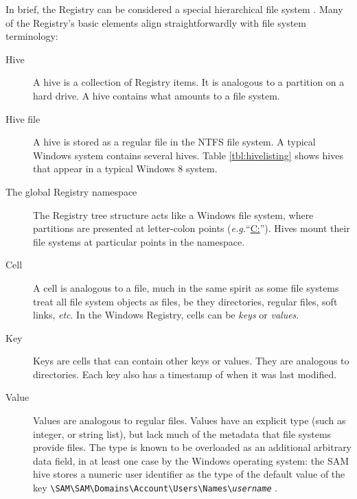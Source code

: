 \documentclass[11pt]{ucthesis}
\theoremstyle{plain}
\theoremstyle{definition}
\newcommand{\eg}{\emph{e.g.}\xspace}
\newcommand{\etc}{\emph{etc}\xspace}
\newcommand{\breakingbackslash}{\textbackslash\allowbreak{}}
\begin{document}
In brief, the Registry can be considered a special hierarchical file system \cite{nelson:ifip12}.  Many of the Registry's basic elements align straightforwardly with file system terminology:

\begin{description}
\item[Hive] A hive is a collection of Registry items.  It is analogous to a partition on a hard drive.  A hive contains what amounts to a file system.
\item[Hive file] A hive is stored as a regular file in the NTFS file system.  A typical Windows system contains several hives.  Table \ref{tbl:hivelisting} shows hives that appear in a typical Windows 8 system.
\item[The global Registry namespace] The Registry tree structure acts like a Windows file system, where partitions are presented at letter-colon points (\eg ``\url{C:}'').  Hives mount their file systems at particular points in the namespace.
\item[Cell] A cell is analogous to a file, much in the same spirit as some file systems treat all file system objects as files, be they directories, regular files, soft links, \etc.  In the Windows Registry, cells can be \emph{keys} or \emph{values}.
\item[Key] Keys are cells that can contain other keys or values.  They are analogous to directories.  Each key also has a timestamp of when it was last modified.
\item[Value] Values are analogous to regular files.  Values have an explicit type (such as integer, or string list), but lack much of the metadata that file systems provide files.  The type is known to be overloaded as an additional arbitrary data field, in at least one case by the Windows operating system: the SAM hive stores a numeric user identifier as the type of the default value of the key \texttt{{\breakingbackslash}SAM{\breakingbackslash}SAM{\breakingbackslash}Domains{\breakingbackslash}Account{\breakingbackslash}Users{\breakingbackslash}Names{\breakingbackslash}\textit{username}} \cite{jones:blog20100609}.

\end{description}
\end{document}

